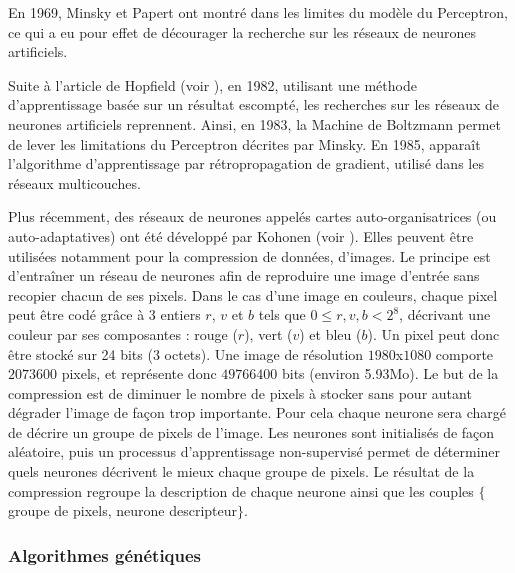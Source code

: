 En 1969, Minsky et Papert ont montré dans \cite{Minsky1969} les limites du modèle du Perceptron, ce qui a eu pour effet de décourager la recherche sur les réseaux de neurones artificiels.

Suite à l'article de Hopfield (voir \cite{Hopfield1982}), en 1982, utilisant une méthode d'apprentissage basée sur un résultat escompté, les recherches sur les réseaux de neurones artificiels reprennent. Ainsi, en 1983, la Machine de Boltzmann permet de lever les limitations du Perceptron décrites par Minsky. En 1985, apparaît l'algorithme d'apprentissage par rétropropagation de gradient, utilisé dans les réseaux multicouches.

Plus récemment, des réseaux de neurones appelés cartes auto-organisatrices (ou auto-adaptatives) ont été développé par Kohonen (voir \cite{Kohonen1982}). Elles peuvent être utilisées notamment pour la compression de données, d'images. Le principe est d'entraîner un réseau de neurones afin de reproduire une image d'entrée sans recopier chacun de ses pixels. Dans le cas d'une image en couleurs, chaque pixel peut être codé grâce à 3 entiers $r$, $v$ et $b$ tels que $0\leq r, v, b < 2^8$, décrivant une couleur par ses composantes : rouge ($r$), vert ($v$) et bleu ($b$). Un pixel peut donc être stocké sur 24 bits (3 octets). Une image de résolution $1980$x$1080$ comporte $2073600$ pixels, et représente donc $49766400$ bits (environ 5.93Mo). Le but de la compression est de diminuer le nombre de pixels à stocker sans pour autant dégrader l'image de façon trop importante. Pour cela chaque neurone sera chargé de décrire un groupe de pixels de l'image. Les neurones sont initialisés de façon aléatoire, puis un 
processus d'apprentissage non-supervisé permet de déterminer quels 
neurones décrivent le mieux chaque groupe de pixels. Le résultat de la compression regroupe la description de chaque neurone ainsi que les couples $\{$groupe de pixels, neurone descripteur$\}$.\\

\subsubsection{Algorithmes génétiques}


